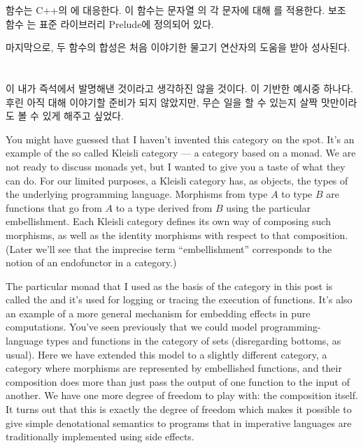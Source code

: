  함수는 C++의 에 대응한다. 이 함수는 문자열 의 각 문자에 대해 를 적용한다.
보조 함수 는 표준 라이브러리 Prelude에 정의되어 있다.

마지막으로, 두 함수의 합성은 처음 이야기한 물고기 연산자의 도움을 받아 성사된다.


\section{\trKleisli \trCategory}

이  내가 즉석에서 발명해낸 것이라고 생각하진 않을 것이다.
이   기반한  \trKleisli{} 예시중 하나다.
후린 아직  대해 이야기할 준비가 되지 않았지만,  무슨 일을 할 수 있는지 살짝 맛만이라도 볼 수 있게 해주고 싶었다.

You might have guessed that I haven't invented this category on the
spot. It's an example of the so called Kleisli category --- a category
based on a monad. We are not ready to discuss monads yet, but I wanted
to give you a taste of what they can do. For our limited purposes, a
Kleisli category has, as objects, the types of the underlying
programming language. Morphisms from type $A$ to type $B$ are functions that
go from $A$ to a type derived from $B$ using the particular embellishment.
Each Kleisli category defines its own way of composing such morphisms,
as well as the identity morphisms with respect to that composition.
(Later we'll see that the imprecise term ``embellishment'' corresponds
to the notion of an endofunctor in a category.)

The particular monad that I used as the basis of the category in this
post is called the  and it's used for logging or
tracing the execution of functions. It's also an example of a more
general mechanism for embedding effects in pure computations. You've
seen previously that we could model programming-language types and
functions in the category of sets (disregarding bottoms, as usual). Here
we have extended this model to a slightly different category, a category
where morphisms are represented by embellished functions, and their
composition does more than just pass the output of one function to the
input of another. We have one more degree of freedom to play with: the
composition itself. It turns out that this is exactly the degree of
freedom which makes it possible to give simple denotational semantics to
programs that in imperative languages are traditionally implemented
using side effects.

